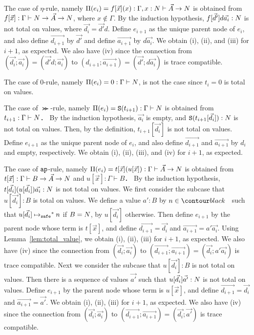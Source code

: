 \documentclass{article}
\newenvironment{proof}[1][Proof]{\begin{trivlist}
\item[\hskip \labelsep {\bfseries #1}]}{\end{trivlist}}
\begin{document}
\begin{proof}
  The case of $\eta$-rule, namely 
  $\Pi(e_i) = f[\vec{x}](x): \Gamma,x:N\vdash \vec{A}\rightarrow{N}$ is obtained from
  $f[\vec{x}]:\Gamma\vdash N\rightarrow \vec{A} \rightarrow {N}$, where
  $x\not\in\Gamma$.
  By the induction hypothesis, $f[\vec{d'}]d\vec{a_i}:{N}$ is not total on values,
  where $\vec{d_i} = \vec{d'}d$.
  Define $e_{i+1}$ as the unique parent node of $e_i$, and
  also define $\vec{d_{i+1}}$ by $\vec{d'}$ and define $\vec{a_{i+1}}$ by $d\vec{a_i}$. 
  We obtain (i), (ii), and (iii) for $i+1$, as expected.
  We also have (iv) since the connection from
  $(\vec{d_i};\vec{a_i}) = (\vec{d'}d;\vec{a_i})$ to
  $(d_{i+1};\vec{a_{i+1}}) = (\vec{d'};d\vec{a_i})$
  is trace compatible. 

  The case of $0$-rule, namely $\Pi(e_i) = 0:\Gamma\vdash {N}$, is not the case since $t_i = 0$ is total on values.
  
  The case of $\Succ$-rule, namely $\Pi(e_i) = {\tt S}(t_{i+1}):\Gamma\vdash {N}$ is obtained from
  $t_{i+1}:\Gamma\vdash {N}$．
  By the induction hypothesis, $\vec{a_i}$ is empty, and 
  ${\tt S}(t_{i+1}[\vec{d_i}]):{N}$ is not total on values.
  Then, by the definition, $t_{i+1}[\vec{d_i}]$ is not total on values. 
  Define $e_{i+1}$ as the unique parent node of $e_i$, and
  also define $\vec{d_{i+1}}$ and $\vec{a_{i+1}}$ by $d_i$ and empty, respectively. 
  We obtain (i), (ii), (iii), and (iv) for $i+1$, as expected.

  The case of ${\tt ap}$-rule, namely 
  $\Pi(e_i) = t[\vec{x}](u[\vec{x}]):\Gamma\vdash \vec{A}\rightarrow{N}$ is obtained from
  $t[\vec{x}]:\Gamma\vdash B \rightarrow \vec{A}\rightarrow{N}$ and $u[\vec{x}]:\Gamma\vdash B$．
  By the induction hypothesis, $t[\vec{d_i}](u[\vec{d_i}])\vec{a_i}:{N}$ is not total on values.
  We first consider the subcase that $u[\vec{d_i}]:B$ is total on values.
  We define a value $a':B$ by $n\in\Nat$ such that $u[\vec{d_i}] \mathbin{{\mapsto}_{\tiny \tt safe}}^* n$ if $B={N}$,
  by $u[\vec{d_i}]$ otherwise.
  Then define $e_{i+1}$ by the parent node whose term is $t[\vec{x}]$,
  and define $\vec{d_{i+1}} = \vec{d_i}$ and $\vec{a_{i+1}} = a'\vec{a_i}$. 
  Using Lemma~\ref{lem:total_value}, we obtain (i), (ii), (iii) for $i+1$, as expected. 
  We also have (iv) since the connection from 
  $(\vec{d_i};\vec{a_i})$ to $(\vec{d_{i+1}};\vec{a_{i+1}}) = (\vec{d_i};a'\vec{a_i})$ is
  trace compatible. 
  Next we consider the subcase that $u[\vec{d_i}]:B$ is not total on values.
  Then there is a sequence of values $\vec{a'}$ such that $u[\vec{d_i}]\vec{a'}:{N}$ is not total on values.
  Define $e_{i+1}$ by the parent node whose term is $u[\vec{x}]$,
  and define $\vec{d_{i+1}} = \vec{d_i}$ and $\vec{a_{i+1}} = \vec{a'}$. 
  We obtain (i), (ii), (iii) for $i+1$, as expected.
  We also have (iv) since the connection from 
  $(\vec{d_i};\vec{a_i})$ to $(\vec{d_{i+1}};\vec{a_{i+1}}) = (\vec{d_i};\vec{a'})$ is
  trace compatible. 
  

\end{proof}
\end{document}
